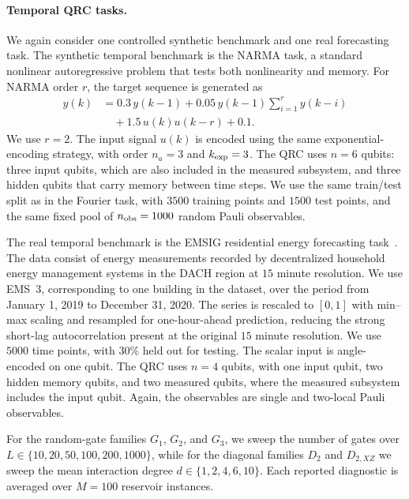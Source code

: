 \documentclass[
    aps,
    pre,
    amsmath,
    amssymb,
    reprint,
    superscriptaddress,
    preprintnumbers,
]{revtex4-2}
\begin{document}
\paragraph{Temporal QRC tasks.}
 We again consider one controlled synthetic benchmark and one real forecasting task. The synthetic temporal benchmark is the NARMA task, a standard nonlinear autoregressive problem that tests both nonlinearity and memory. For NARMA order $r$, the target sequence is generated as
\begin{equation}
\begin{aligned}
y(k)
&=
0.3\,y(k-1)
+
0.05\,y(k-1)\sum_{i=1}^{r} y(k-i)
\\
&\quad+
1.5\,u(k)u(k-r)
+
0.1 .
\end{aligned}
\label{eq:narma}
\end{equation}
%
We use $r=2$. The input signal $u(k)$ is encoded using the same exponential-encoding strategy, with order $n_a = 3$ and $k_{\rm exp}=3$. The QRC uses $n=6$ qubits: three input qubits, which are also included in the measured subsystem, and three hidden qubits that carry memory between time steps. We use the same train/test split as in the Fourier task, with $3500$ training points and $1500$ test points, and the same fixed pool of $n_{\rm obs}=1000$ random Pauli observables.

The real temporal benchmark is the EMSIG residential energy forecasting task~\cite{brucke2024benchmarking}. The data consist of energy measurements recorded by decentralized household energy management systems in the DACH region at $15$ minute resolution. We use EMS~3, corresponding to one building in the dataset, over the period from January 1, 2019 to December 31, 2020. The series is rescaled to $[0,1]$ with min--max scaling and resampled for one-hour-ahead prediction, reducing the strong short-lag autocorrelation present at the original $15$ minute resolution. We use $5000$ time points, with $30\%$ held out for testing. The scalar input is angle-encoded on one qubit. The QRC uses $n=4$ qubits, with one input qubit, two hidden memory qubits, and two measured qubits, where the measured subsystem includes the input qubit. Again, the observables are single and two-local Pauli observables.

For the random-gate families $G_1$, $G_2$, and $G_3$, we sweep the number of gates over $L\in\{10,20,50,100,200,1000\}$, while for the diagonal families $D_2$ and $D_{2,XZ}$ we sweep the mean interaction degree $d\in \{1,2,4,6,10\}$. Each reported diagnostic is averaged over $M=100$ reservoir instances.
\end{document}

